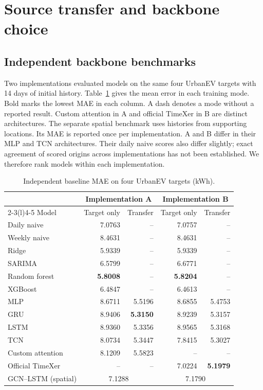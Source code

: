 \section{Source transfer and backbone choice}
\subsection{Independent backbone benchmarks}
Two implementations evaluated models on the same four UrbanEV targets with 14 days of initial history. Table~\ref{tab:baselines} gives the mean error in each training mode. Bold marks the lowest MAE in each column. A dash denotes a mode without a reported result. Custom attention in A and official TimeXer in B \cite{wang2024timexer} are distinct architectures. The separate spatial benchmark uses histories from supporting locations. Its MAE is reported once per implementation. A and B differ in their MLP and TCN architectures. Their daily naive scores also differ slightly; exact agreement of scored origins across implementations has not been established. We therefore rank models within each implementation.
\begin{table}[H]
\centering\small
\caption{Independent baseline MAE on four UrbanEV targets (kWh).}\label{tab:baselines}
\begin{tabular*}{\textwidth}{@{\extracolsep{\fill}}lrrrr@{}}\toprule
& \multicolumn{2}{c}{Implementation A} & \multicolumn{2}{c}{Implementation B}\\\cmidrule(lr){2-3}\cmidrule(l){4-5}
Model & Target only & Transfer & Target only & Transfer\\\midrule
Daily naive & 7.0763 & -- & 7.0757 & --\\
Weekly naive & 8.4631 & -- & 8.4631 & --\\
Ridge & 5.9339 & -- & 5.9339 & --\\
SARIMA & 6.5799 & -- & 6.6771 & --\\
Random forest & \textbf{5.8008} & -- & \textbf{5.8204} & --\\
XGBoost & 6.4847 & -- & 6.4613 & --\\
MLP & 8.6711 & 5.5196 & 8.6855 & 5.4753\\
GRU & 8.9406 & \textbf{5.3150} & 8.9239 & 5.3157\\
LSTM & 8.9360 & 5.3356 & 8.9565 & 5.3168\\
TCN & 8.0734 & 5.3447 & 7.8415 & 5.3027\\
Custom attention & 8.1209 & 5.5823 & -- & --\\
Official TimeXer & -- & -- & 7.0224 & \textbf{5.1979}\\
\midrule
GCN--LSTM (spatial) & \multicolumn{2}{c}{7.1288} & \multicolumn{2}{c}{7.1790}\\
\bottomrule\end{tabular*}
\end{table}

